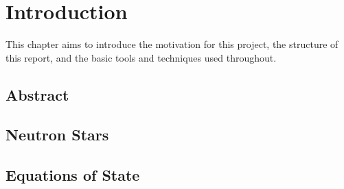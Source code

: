 \chapter{Introduction}

This chapter aims to introduce the motivation for this project, the structure of this report, and the basic tools and techniques used throughout.

\section{Abstract}


\section{Neutron Stars}

\section{Equations of State}